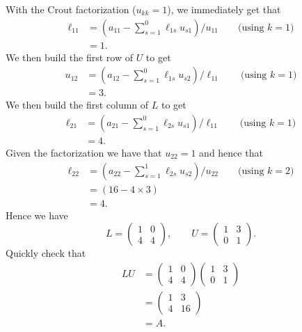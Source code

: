 \documentclass[10pt]{article}
\begin{document}
\begin{enumerate}
  With the Crout factorization ($u_{kk} = 1$), we immediately get
  that
  \begin{align*}
    \ell_{11} & = \left( a_{11} - \sum_{s=1}^{0} \ell_{1s} u_{s1} \right) /
    u_{11} \qquad \text{(using $k=1$)} \\
    & = 1.
  \end{align*}
  We then build the first row of $U$ to get
  \begin{align*}
    u_{12} & = \left( a_{12} - \sum_{s=1}^{0} \ell_{1s} u_{s2} \right) /
    \ell_{11} \qquad \text{(using $k=1$)} \\
    & = 3.
  \end{align*}
  We then build the first column of $L$ to get
  \begin{align*}
    \ell_{21} & = \left( a_{21} - \sum_{s=1}^{0} \ell_{2s} u_{s1} \right) /
    \ell_{11} \qquad \text{(using $k=1$)} \\
    & = 4.
  \end{align*}
  Given the factorization we have that $u_{22} = 1$ and hence that
  \begin{align*}
    \ell_{22} & = \left( a_{22} - \sum_{s=1}^{1} \ell_{2s} u_{s2} \right) /
    u_{22} \qquad \text{(using $k=2$)} \\
    & = (16 - 4 \times 3) \\
    & = 4.
  \end{align*}
  Hence we have
  \begin{equation*}
    L =
    \begin{pmatrix}
      1 & 0 \\ 4 & 4
    \end{pmatrix}, \qquad U =
    \begin{pmatrix}
      1 & 3 \\ 0 & 1
    \end{pmatrix}.
  \end{equation*}
  Quickly check that
  \begin{align*}
    L U & = \begin{pmatrix}
      1 & 0 \\ 4 & 4
    \end{pmatrix} 
    \begin{pmatrix}
      1 & 3 \\ 0 & 1
    \end{pmatrix} \\
    & = \begin{pmatrix}
      1 & 3 \\ 4 & 16
    \end{pmatrix} \\
    & = A.
  \end{align*}


\end{enumerate}
\end{document}
